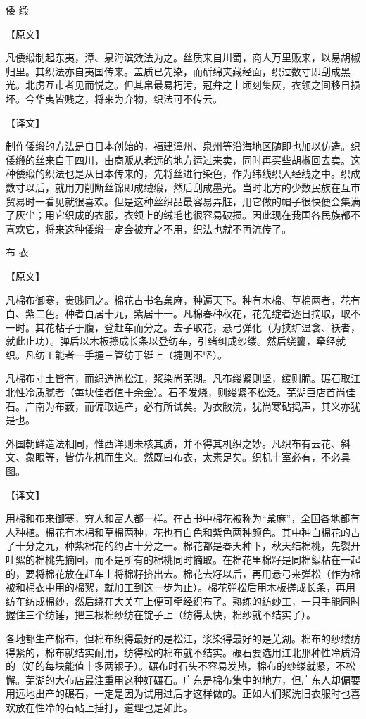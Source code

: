 \documentclass[12pt,UTF8]{ctexbook}
\begin{document}
倭 缎

【原文】

凡倭缎制起东夷，漳、泉海滨效法为之。丝质来自川蜀，商人万里贩来，以易胡椒归里。其织法亦自夷国传来。盖质已先染，而斫绵夹藏经面，织过数寸即刮成黑光。北虏互市者见而悦之。但其帛最易朽污，冠弁之上顷刻集灰，衣领之间移日损坏。今华夷皆贱之，将来为弃物，织法可不传云。

【译文】

制作倭缎的方法是自日本创始的，福建漳州、泉州等沿海地区随即也加以仿造。织倭缎的丝来自于四川，由商贩从老远的地方运过来卖，同时再买些胡椒回去卖。这种倭缎的织法也是从日本传来的，先将丝进行染色，作为纬线织入经线之中。织成数寸以后，就用刀削断丝锦即成绒缎，然后刮成墨光。当时北方的少数民族在互市贸易时一看见就很喜欢。但是这种丝织品最容易弄脏，用它做的帽子很快便会集满了灰尘；用它织成的衣服，衣领上的绒毛也很容易破损。因此现在我国各民族都不喜欢它，将来这种倭缎一定会被弃之不用，织法也就不再流传了。

布 衣

【原文】

凡棉布御寒，贵贱同之。棉花古书名枲麻，种遍天下。种有木棉、草棉两者，花有白、紫二色。种者白居十九，紫居十一。凡棉春种秋花，花先绽者逐日摘取，取不一时。其花粘子于腹，登赶车而分之。去子取花，悬弓弹化（为挟纩温衾、袄者，就此止功）。弹后以木板擦成长条以登纺车，引绪纠成纱缕。然后绕籰，牵经就织。凡纺工能者一手握三管纺于铤上（捷则不坚）。

凡棉布寸土皆有，而织造尚松江，浆染尚芜湖。凡布缕紧则坚，缓则脆。碾石取江北性冷质腻者（每块佳者值十余金）。石不发烧，则缕紧不松泛。芜湖巨店首尚佳石。广南为布薮，而偏取远产，必有所试矣。为衣敝浣，犹尚寒砧捣声，其义亦犹是也。

外国朝鲜造法相同，惟西洋则未核其质，并不得其机织之妙。凡织布有云花、斜文、象眼等，皆仿花机而生义。然既曰布衣，太素足矣。织机十室必有，不必具图。

【译文】

用棉和布来御寒，穷人和富人都一样。在古书中棉花被称为“枲麻”，全国各地都有人种植。棉花有木棉和草棉两种，花也有白色和紫色两种颜色。其中种白棉花的占了十分之九，种紫棉花的约占十分之一。棉花都是春天种下，秋天结棉桃，先裂开吐絮的棉桃先摘回，而不是所有的棉桃同时摘取。在棉花里棉籽是同棉絮粘在一起的，要将棉花放在赶车上将棉籽挤出去。棉花去籽以后，再用悬弓来弹松（作为棉被和棉衣中用的棉絮，就加工到这一步为止）。棉花弹松后用木板搓成长条，再用纺车纺成棉纱，然后绕在大关车上便可牵经织布了。熟练的纺纱工，一只手能同时握住三个纺锤，把三根棉纱纺在锭子上（纺得太快，棉纱就不结实了）。

各地都生产棉布，但棉布织得最好的是松江，浆染得最好的是芜湖。棉布的纱缕纺得紧的，棉布就结实耐用，纺得松的棉布就不结实。碾石要选用江北那种性冷质滑的（好的每块能值十多两银子）。碾布时石头不容易发热，棉布的纱缕就紧，不松懈。芜湖的大布店最注重用这种好碾石。广东是棉布集中的地方，但广东人却偏要用远地出产的碾石，一定是因为试用过后才这样做的。正如人们浆洗旧衣服时也喜欢放在性冷的石砧上捶打，道理也是如此。
\end{document}
